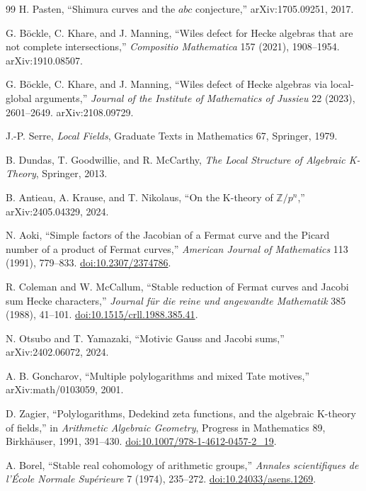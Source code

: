 \begin{thebibliography}{99}
H. Pasten,
``Shimura curves and the $abc$ conjecture,''
arXiv:1705.09251, 2017.

G. B\"ockle, C. Khare, and J. Manning,
``Wiles defect for Hecke algebras that are not complete intersections,''
\emph{Compositio Mathematica} 157 (2021), 1908--1954.
arXiv:1910.08507.

G. B\"ockle, C. Khare, and J. Manning,
``Wiles defect of Hecke algebras via local-global arguments,''
\emph{Journal of the Institute of Mathematics of Jussieu} 22 (2023), 2601--2649.
arXiv:2108.09729.

J.-P. Serre,
\emph{Local Fields},
Graduate Texts in Mathematics 67, Springer, 1979.

B. Dundas, T. Goodwillie, and R. McCarthy,
\emph{The Local Structure of Algebraic K-Theory},
Springer, 2013.

B. Antieau, A. Krause, and T. Nikolaus,
``On the K-theory of $\mathbb Z/p^n$,''
arXiv:2405.04329, 2024.

N. Aoki,
``Simple factors of the Jacobian of a Fermat curve and the Picard number of a product of Fermat curves,''
\emph{American Journal of Mathematics} 113 (1991), 779--833.
\href{https://doi.org/10.2307/2374786}{doi:10.2307/2374786}.

R. Coleman and W. McCallum,
``Stable reduction of Fermat curves and Jacobi sum Hecke characters,''
\emph{Journal f\"ur die reine und angewandte Mathematik} 385 (1988), 41--101.
\href{https://doi.org/10.1515/crll.1988.385.41}{doi:10.1515/crll.1988.385.41}.

N. Otsubo and T. Yamazaki,
``Motivic Gauss and Jacobi sums,''
arXiv:2402.06072, 2024.

A. B. Goncharov,
``Multiple polylogarithms and mixed Tate motives,''
arXiv:math/0103059, 2001.

D. Zagier,
``Polylogarithms, Dedekind zeta functions, and the algebraic K-theory of fields,''
in \emph{Arithmetic Algebraic Geometry}, Progress in Mathematics 89,
Birkh\"auser, 1991, 391--430.
\href{https://doi.org/10.1007/978-1-4612-0457-2_19}{doi:10.1007/978-1-4612-0457-2\_19}.

A. Borel,
``Stable real cohomology of arithmetic groups,''
\emph{Annales scientifiques de l'\'Ecole Normale Sup\'erieure} 7 (1974), 235--272.
\href{https://doi.org/10.24033/asens.1269}{doi:10.24033/asens.1269}.


\end{thebibliography}
